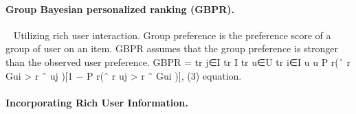\paragraph{Group Bayesian personalized ranking (GBPR).}~%
Utilizing rich user interaction.
Group preference is the preference score of a group of user on an item. %
GBPR assumes that the group preference is stronger than the observed user preference.
GBPR =
tr j∈I tr I tr
u∈U tr i∈I u
u
P r(ˆ
r Gui > r ˆ uj )[1 − P r(ˆ
r uj > r ˆ Gui )], (3)
equation.

\paragraph{Incorporating Rich User Information. }%

